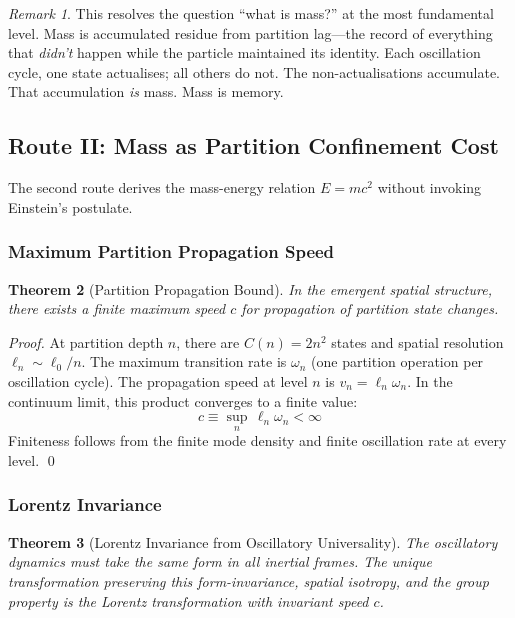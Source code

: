 \documentclass[twocolumn,10pt,a4paper]{article}
\newtheorem{theorem}{Theorem}[section]
\theoremstyle{definition}
\theoremstyle{remark}
\newtheorem{remark}[theorem]{Remark}
\begin{document}
\begin{remark}
This resolves the question ``what is mass?'' at the most fundamental level. Mass is accumulated residue from partition lag---the record of everything that \emph{didn't} happen while the particle maintained its identity. Each oscillation cycle, one state actualises; all others do not. The non-actualisations accumulate. That accumulation \emph{is} mass. Mass is memory.
\end{remark}

\subsection{Route II: Mass as Partition Confinement Cost}

The second route derives the mass-energy relation $E = mc^2$ without invoking Einstein's postulate.

\subsubsection{Maximum Partition Propagation Speed}

\begin{theorem}[Partition Propagation Bound]
\label{thm:propagation}
In the emergent spatial structure, there exists a finite maximum speed $c$ for propagation of partition state changes.
\end{theorem}

\begin{proof}
At partition depth $n$, there are $C(n) = 2n^2$ states and spatial resolution $\ell_n \sim \ell_0/n$. The maximum transition rate is $\omega_n$ (one partition operation per oscillation cycle). The propagation speed at level $n$ is $v_n = \ell_n \omega_n$. In the continuum limit, this product converges to a finite value:
\begin{equation}
    c \equiv \sup_n \, \ell_n \omega_n < \infty
\end{equation}
Finiteness follows from the finite mode density and finite oscillation rate at every level. \qed
\end{proof}

\subsubsection{Lorentz Invariance}

\begin{theorem}[Lorentz Invariance from Oscillatory Universality]
\label{thm:lorentz}
The oscillatory dynamics must take the same form in all inertial frames. The unique transformation preserving this form-invariance, spatial isotropy, and the group property is the Lorentz transformation with invariant speed $c$.
\end{theorem}
\end{document}
